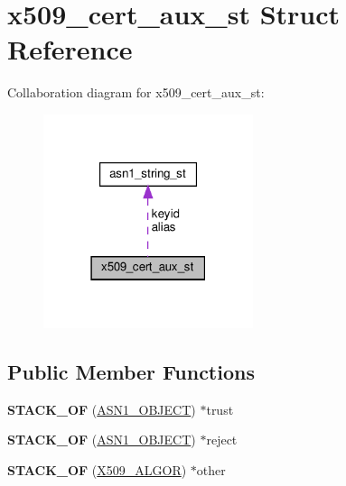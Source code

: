 \hypertarget{structx509__cert__aux__st}{}\section{x509\+\_\+cert\+\_\+aux\+\_\+st Struct Reference}
\label{structx509__cert__aux__st}


Collaboration diagram for x509\+\_\+cert\+\_\+aux\+\_\+st\+:
\nopagebreak
\begin{figure}[H]
\begin{center}
\leavevmode
\includegraphics[width=174pt]{structx509__cert__aux__st__coll__graph}
\end{center}
\end{figure}
\subsection*{Public Member Functions}
\begin{DoxyCompactItemize}
\item 
\mbox{\label{structx509__cert__aux__st_a5722dd9d276e0231b70b66d6aa7b26a2}} 
{\bfseries S\+T\+A\+C\+K\+\_\+\+OF} (\hyperlink{structasn1__object__st}{A\+S\+N1\+\_\+\+O\+B\+J\+E\+CT}) $\ast$trust
\item 
\mbox{\label{structx509__cert__aux__st_a45425310f50ad0ca0c2fc0a6ab7cd600}} 
{\bfseries S\+T\+A\+C\+K\+\_\+\+OF} (\hyperlink{structasn1__object__st}{A\+S\+N1\+\_\+\+O\+B\+J\+E\+CT}) $\ast$reject
\item 
\mbox{\label{structx509__cert__aux__st_abb54f8042a8a28a43258abf811bdc2d6}} 
{\bfseries S\+T\+A\+C\+K\+\_\+\+OF} (\hyperlink{structX509__algor__st}{X509\+\_\+\+A\+L\+G\+OR}) $\ast$other
\end{DoxyCompactItemize}
